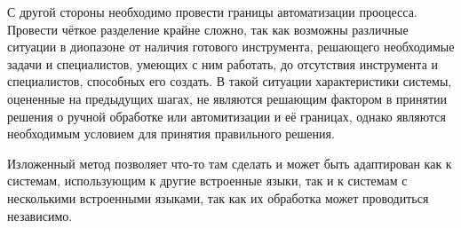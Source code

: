 \begin{enumerate}
  С другой стороны необходимо провести границы автоматизации прооцесса. Провести чёткое разделение крайне сложно, так как возможны различные ситуации в диопазоне от наличия готового инструмента, решающего необходимые задачи и специалистов, умеющих с ним работать, до отсутствия инструмента и специалистов, способных его создать. В такой ситуации характеристики системы, оцененные на предыдущих шагах, не являются решающим фактором в принятии решения о ручной обработке или автомитизации и её границах, однако являются необходимым условием для принятия правильного решения. 
  
\end{enumerate}

Изложенный метод позволяет что-то там сделать и может быть адаптирован как к системам, использующим к другие встроенные языки, так и к системам с несколькими встроенными языками, так как их обработка может проводиться независимо. 



\clearpage
